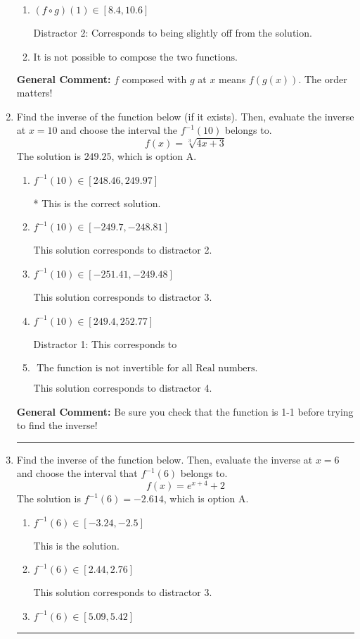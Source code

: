 \documentclass{extbook}[14pt]
\newcommand{\litem}[1]{\item #1

\rule{\textwidth}{0.4pt}}
\begin{document}
\begin{enumerate}
{\begin{enumerate}[label=\Alph*.]
* This is the correct solution
\item \( (f \circ g)(1) \in [8.4, 10.6] \)

 Distractor 2: Corresponds to being slightly off from the solution.
\item \( \text{It is not possible to compose the two functions.} \)


\end{enumerate}

\textbf{General Comment:} $f$ composed with $g$ at $x$ means $f(g(x))$. The order matters!
}
\litem{
Find the inverse of the function below (if it exists). Then, evaluate the inverse at $x = 10$ and choose the interval the $f^{-1}(10)$ belongs to.
\[ f(x) = \sqrt[3]{4 x + 3} \]The solution is \( 249.25 \), which is option A.\begin{enumerate}[label=\Alph*.]
\item \( f^{-1}(10) \in [248.46, 249.97] \)

* This is the correct solution.
\item \( f^{-1}(10) \in [-249.7, -248.81] \)

 This solution corresponds to distractor 2.
\item \( f^{-1}(10) \in [-251.41, -249.48] \)

 This solution corresponds to distractor 3.
\item \( f^{-1}(10) \in [249.4, 252.77] \)

 Distractor 1: This corresponds to 
\item \( \text{ The function is not invertible for all Real numbers. } \)

 This solution corresponds to distractor 4.
\end{enumerate}

\textbf{General Comment:} Be sure you check that the function is 1-1 before trying to find the inverse!
}
\litem{
Find the inverse of the function below. Then, evaluate the inverse at $x = 6$ and choose the interval that $f^{-1}(6)$ belongs to.
\[ f(x) = e^{x+4}+2 \]The solution is \( f^{-1}(6) = -2.614 \), which is option A.\begin{enumerate}[label=\Alph*.]
\item \( f^{-1}(6) \in [-3.24, -2.5] \)

 This is the solution.
\item \( f^{-1}(6) \in [2.44, 2.76] \)

 This solution corresponds to distractor 3.
\item \( f^{-1}(6) \in [5.09, 5.42] \)


\end{enumerate}}
\end{enumerate}
\end{document}
